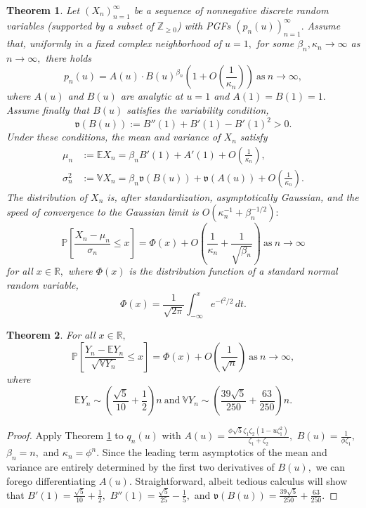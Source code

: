 \documentclass[11pt, reqno]{amsart}
\newtheorem{theorem}{Theorem} %
\theoremstyle{definition}
\renewcommand{\leq}{\leqslant}
\renewcommand{\geq}{\geqslant}
\begin{document}
\begin{theorem}
\label{quasipowers}
Let $(X_n)_{n = 1}^{\infty}$ be a sequence of nonnegative discrete random variables (supported by a subset of $\mathbb{Z}_{\geq 0}$) with PGFs $(p_n(u))_{n = 1}^{\infty}.$ Assume that, uniformly in a fixed complex neighborhood of $u = 1,$ for some $\beta_n, \kappa_n \to \infty$ as $n \to \infty,$ there holds
\[p_n(u) = A(u)\cdot B(u)^{\beta_n}\left(1 + O\left(\frac{1}{\kappa_n}\right)\right)\ \text{as}\ n \to \infty,\]
where $A(u)$ and $B(u)$ are analytic at $u = 1$ and $A(1) = B(1) = 1.$ Assume finally that $B(u)$ satisfies the variability condition,
\[\mathfrak{v}(B(u)) := B''(1) + B'(1) - B'(1)^2 > 0.\]
Under these conditions, the mean and variance of $X_n$ satisfy
\begin{align*}
\mu_n &:= \mathbb{E}X_n = \beta_nB'(1) + A'(1) + O\left(\frac{1}{\kappa_n}\right), \\
\sigma_n^2 &:= \mathbb{V}X_n = \beta_n\mathfrak{v}(B(u)) + \mathfrak{v}(A(u)) + O\left(\frac{1}{\kappa_n}\right).
\end{align*}
The distribution of $X_n$ is, after standardization, asymptotically Gaussian, and the speed of convergence to the Gaussian limit is $O(\kappa_n^{-1} + \beta_n^{-1/2}):$
\[\mathbb{P}\left[\frac{X_n - \mu_n}{\sigma_n} \leq x\right] = \Phi(x) + O\!\left(\frac{1}{\kappa_n} + \frac{1}{\sqrt{\beta_n}}\right)\ \text{as}\ n \to \infty\]
for all $x \in \mathbb{R},$ where $\Phi(x)$ is the distribution function of a standard normal random variable,
\[\Phi(x) = \frac{1}{\sqrt{2\pi}}\int_{-\infty}^{x} e^{-t^2/2}\,dt.\]
\end{theorem}

\begin{theorem}
For all $x \in \mathbb{R},$
\[\mathbb{P}\left[\frac{Y_n - \mathbb{E}Y_n}{\sqrt{\mathbb{V}Y_n}} \leq x\right] = \Phi(x) + O\!\left(\frac{1}{\sqrt{n}}\right)\ \text{as}\ n \to \infty,\]
where
\[\mathbb{E}Y_n \sim \left(\frac{\sqrt{5}}{10}+\frac{1}{2}\right)n\ \text{and}\ \mathbb{V}Y_n \sim \left(\frac{39\sqrt{5}}{250} + \frac{63}{250}\right)n.\]
\end{theorem}

\begin{proof}
Apply Theorem \ref{quasipowers} to $q_n(u)$ with $A(u) = \frac{\phi\sqrt{5}\zeta_1\zeta_2(1-u\zeta_1^2)}{\zeta_1 + \zeta_2},$ $B(u) = \frac{1}{\phi\zeta_1},$ $\beta_n = n,$ and $\kappa_n = \phi^n.$ Since the leading term asymptotics of the mean and variance are entirely determined by the first two derivatives of $B(u),$ we can forego differentiating $A(u).$ Straightforward, albeit tedious calculus will show that $B'(1) = \frac{\sqrt{5}}{10} + \frac{1}{2},$ $B''(1) = \frac{\sqrt{5}}{25} - \frac{1}{5},$ and $\mathfrak{v}(B(u)) = \frac{39\sqrt{5}}{250} + \frac{63}{250}.$
\end{proof}
\end{document}
